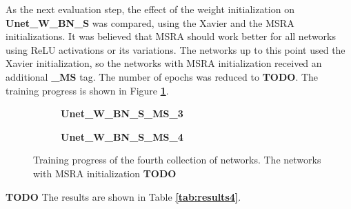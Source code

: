 \noindent As the next evaluation step, the effect of the weight initialization on \textbf{Unet\_W\_BN\_S} was compared, using the Xavier and the MSRA initializations. It was believed that MSRA should work better for all networks using ReLU activations or its variations. The networks up to this point used the Xavier initialization, so the networks with MSRA initialization received an additional \textbf{\_MS} tag. The number of epochs was reduced to \textbf{TODO}. The training progress is shown in Figure \textbf{\ref{fig:weighted_batchnorm_shuffle_msra_training}}.\\

\begin {figure}[!htb]
	\begin {subfigure}[b]{0.4\linewidth}
		\caption{\textbf{Unet\_W\_BN\_S\_MS\_3}}
	\end {subfigure}\hspace{1.75cm}
	\begin {subfigure}[b]{0.4\linewidth}
		\caption{\textbf{Unet\_W\_BN\_S\_MS\_4}}
	\end {subfigure}

		\caption[Training progress of the fourth collection of networks.]{Training progress of the fourth collection of networks. The networks with MSRA initialization \textbf{TODO}}
		\label{fig:weighted_batchnorm_shuffle_msra_training}
\end {figure}


\textbf{TODO} The results are shown in Table \textbf{\ref{tab:results4}}. \\


